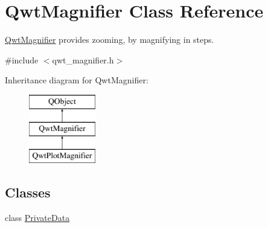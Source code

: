 \hypertarget{class_qwt_magnifier}{\section{Qwt\-Magnifier Class Reference}
\label{class_qwt_magnifier}
}


\hyperlink{class_qwt_magnifier}{Qwt\-Magnifier} provides zooming, by magnifying in steps.  




{\ttfamily \#include $<$qwt\-\_\-magnifier.\-h$>$}

Inheritance diagram for Qwt\-Magnifier\-:\begin{figure}[H]
\begin{center}
\leavevmode
\includegraphics[height=3.000000cm]{class_qwt_magnifier}
\end{center}
\end{figure}
\subsection*{Classes}
\begin{DoxyCompactItemize}
\item 
class \hyperlink{class_qwt_magnifier_1_1_private_data}{Private\-Data}
\end{DoxyCompactItemize}
